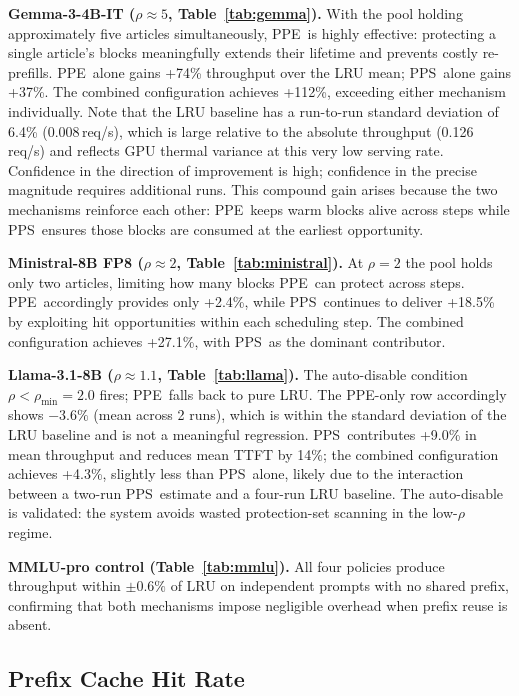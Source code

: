 \documentclass[journal]{IEEEtran}
\newcommand{\ppe}{\textsc{PPE}}
\newcommand{\pps}{\textsc{PPS}}
\newcommand{\rhomin}{\rho_{\min}}
\begin{document}
\textbf{Gemma-3-4B-IT ($\rho\approx5$, Table~\ref{tab:gemma}).}
With the pool holding approximately five articles simultaneously, \ppe\ is
highly effective: protecting a single article's blocks meaningfully extends
their lifetime and prevents costly re-prefills.  \ppe\ alone gains +74\%
throughput over the LRU mean; \pps\ alone gains +37\%.  The combined
configuration achieves +112\%, exceeding either mechanism individually.
Note that the LRU baseline has a run-to-run standard deviation of 6.4\%
(0.008\,req/s), which is large relative to the absolute throughput (0.126\,req/s)
and reflects GPU thermal variance at this very low serving rate.  Confidence in
the direction of improvement is high; confidence in the precise magnitude
requires additional runs. This compound gain arises because the two mechanisms
reinforce each other: \ppe\ keeps warm blocks alive across steps while \pps\
ensures those blocks are consumed at the earliest opportunity.

\textbf{Ministral-8B FP8 ($\rho\approx2$, Table~\ref{tab:ministral}).}
At $\rho=2$ the pool holds only two articles, limiting how many blocks \ppe\
can protect across steps.  \ppe\ accordingly provides only +2.4\%, while \pps\
continues to deliver +18.5\% by exploiting hit opportunities within each
scheduling step.  The combined configuration achieves +27.1\%, with \pps\ as
the dominant contributor.

\textbf{Llama-3.1-8B ($\rho\approx1.1$, Table~\ref{tab:llama}).}
The auto-disable condition $\rho<\rhomin=2.0$ fires; \ppe\ falls back to pure
LRU.  The \ppe-only row accordingly shows $-3.6\%$ (mean across 2 runs), which
is within the standard deviation of the LRU baseline and is not a meaningful
regression.  \pps\ contributes +9.0\% in mean throughput and reduces mean TTFT
by 14\%; the combined configuration achieves +4.3\%, slightly less than \pps\
alone, likely due to the interaction between a two-run \pps\ estimate and a
four-run LRU baseline.  The auto-disable is validated: the system avoids wasted
protection-set scanning in the low-$\rho$ regime.

\textbf{MMLU-pro control (Table~\ref{tab:mmlu}).}
All four policies produce throughput within $\pm0.6\%$ of LRU on independent
prompts with no shared prefix, confirming that both mechanisms impose
negligible overhead when prefix reuse is absent.

\subsection{Prefix Cache Hit Rate}
\label{sec:hitrate}
\end{document}

